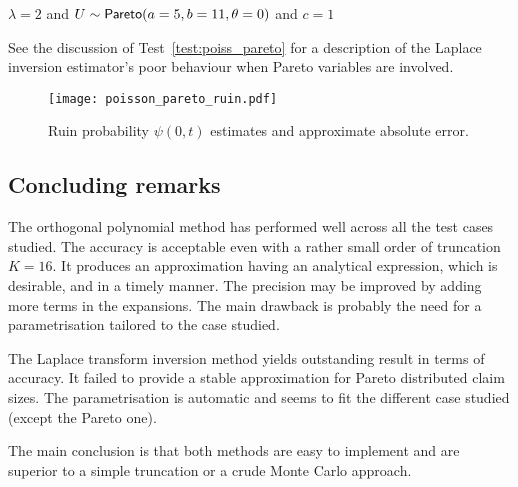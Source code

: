 \begin{test} $\lambda=2$ and $U \sim \mathsf{Pareto}(a=5,b=11,\theta=0)$ and $c=1$
\end{test}

See the discussion of Test~\ref{test:poiss_pareto} for a description of the Laplace inversion estimator's poor behaviour when Pareto variables are involved.

\begin{figure}[H]
\centering
\texttt{[image: poisson\_pareto\_ruin.pdf]}
\caption{Ruin probability $\psi(0, t)$ estimates and approximate absolute error.}
\end{figure}
\subsection{Concluding remarks}
The orthogonal polynomial method has performed well across all the test cases studied. The accuracy is acceptable even with a rather small order of truncation $K=16$. It produces an approximation having an analytical expression, which is desirable, and in a timely manner. The precision may be improved by adding more terms in the expansions. The main drawback is probably the need for a parametrisation tailored to the case studied.

The Laplace transform inversion method yields outstanding result in terms of accuracy. It failed to provide a stable approximation for Pareto distributed claim sizes. The parametrisation is automatic and seems to fit the different case studied (except the Pareto one).

The main conclusion is that both methods are easy to implement and are superior to a simple truncation or a crude Monte Carlo approach.